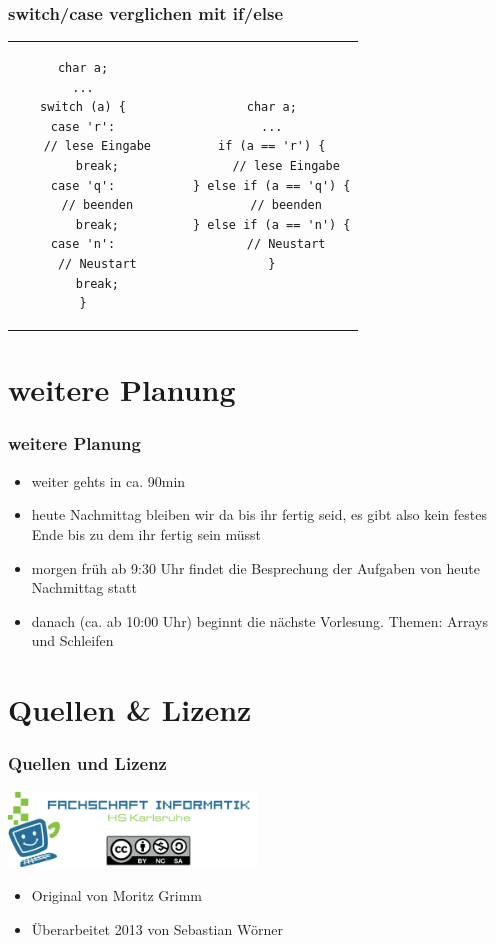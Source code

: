 \documentclass[final]{beamer}
\begin{document}
\begin{frame}[containsverbatim]
\frametitle{switch/case verglichen mit if/else}
	\begin{tabular}{c c c c}
	\begin{lstlisting}
char a;
...
switch (a) {
case 'r':
	// lese Eingabe
	break;
case 'q':
	// beenden
	break;
case 'n':
	// Neustart
	break;
}
	\end{lstlisting} 

& & &
	
	\begin{lstlisting}
char a;
...
if (a == 'r') {
	// lese Eingabe
} else if (a == 'q') {
	// beenden
} else if (a == 'n') {
	// Neustart
}
	\end{lstlisting}\\
	\end{tabular}
\end{frame}

\section{weitere Planung}
\begin{frame}
\frametitle{weitere Planung}
  \begin{itemize}
	\item{weiter gehts in ca. 90min}
	\item{heute Nachmittag bleiben wir da bis ihr fertig seid, es gibt also kein festes Ende bis zu dem ihr fertig sein müsst}
	\item{morgen früh ab 9:30 Uhr findet die Besprechung der Aufgaben von heute Nachmittag statt}
	\item{danach (ca. ab 10:00 Uhr) beginnt die nächste Vorlesung. Themen: Arrays und Schleifen}
  \end{itemize}
\end{frame}

\section{Quellen \& Lizenz}
\begin{frame}
	\frametitle{Quellen und Lizenz}
	\begin{center}
		\includegraphics[width=250px]{gfx/fsi}
	\end{center}
	\begin{itemize}
		\item{Original von Moritz Grimm}
		\item{Überarbeitet 2013 von Sebastian Wörner}
	\end{itemize}
\end{frame}
\end{document}
